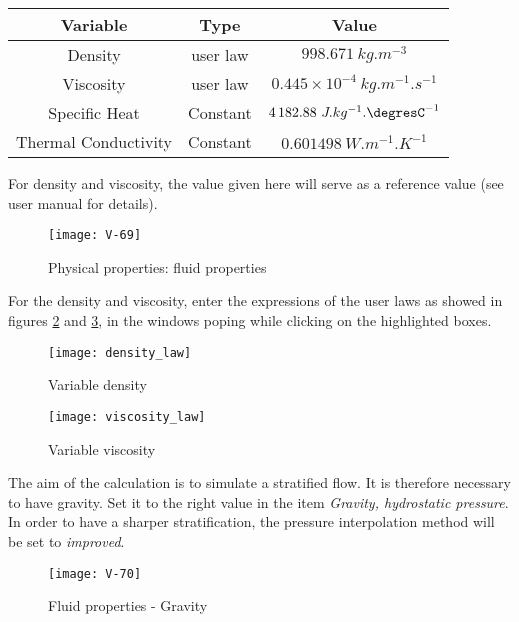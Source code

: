 \begin{center}
\begin{tabular}{c|c|c}
Variable & Type & Value \\
\hline
Density & user law & $998.671\ kg.m^{-3} $ \\
\hline
Viscosity & user law & $0.445\times 10^{-4}\ kg.m^{-1}.s^{-1} $ \\
\hline
Specific Heat & Constant & $4\,182.88\ J.kg^{-1}.\mbox{\degresC}^{-1} $ \\
\hline
Thermal Conductivity & Constant & $0.601498\ W.m^{-1}.K^{-1}$
\end{tabular}
\end{center}

For density and viscosity, the value given here will serve as a reference
value (see user manual for details).

\begin{figure}[h!]
\begin{center}
\texttt{[image: V-69]}
\caption{Physical properties: fluid properties}
\label{fig2_e5}
\end{center}
\end{figure}

\newpage
For the density and viscosity, enter the expressions of the user laws as showed in
figures \ref{fig5_var1} and \ref{fig5_var2}, in the windows poping while clicking on the highlighted boxes.

\begin{figure}[h!]
\begin{center}
\texttt{[image: density\_law]}
\caption{Variable density}
\label{fig5_var1}
\end{center}
\end{figure}

\begin{figure}[h!]
\begin{center}
\texttt{[image: viscosity\_law]}
\caption{Variable viscosity}
\label{fig5_var2}
\end{center}
\end{figure}

\newpage
The aim of the calculation is to simulate a stratified flow. It is therefore
necessary to have gravity. Set it to the right value in the item
{\itshape Gravity, hydrostatic pressure}.  In order to have a sharper
stratification, the pressure interpolation method will be set to
{\itshape improved}.

\begin{figure}[h!]
\begin{center}
\texttt{[image: V-70]}
\caption{Fluid properties - Gravity}
\label{fig3_e5}
\end{center}
\end{figure}


